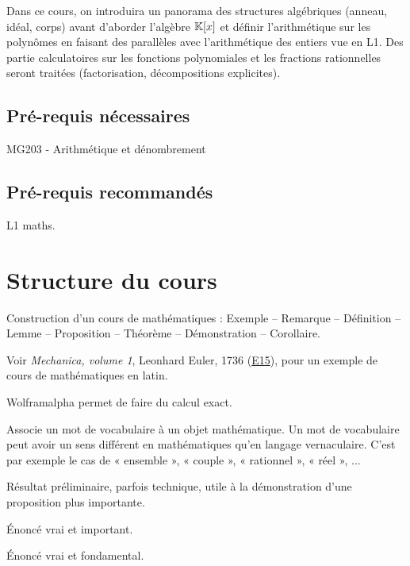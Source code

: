 Dans ce cours, on introduira un panorama des structures algébriques (anneau, idéal, corps) avant d'aborder l'algèbre $\mathbb{K}[x]$ et définir l'arithmétique
sur les polynômes en faisant des parallèles avec l'arithmétique des entiers vue en L1.
Des partie calculatoires sur les fonctions polynomiales et les fractions rationnelles seront traitées (factorisation, décompositions explicites).

\subsection*{Pré-requis nécessaires}

MG203 - Arithmétique et dénombrement

\subsection*{Pré-requis recommandés}

L1 maths.

\section*{Structure du cours}

Construction d'un cours de mathématiques : Exemple -- Remarque -- Définition -- Lemme -- Proposition -- Théorème -- Démonstration -- Corollaire.

Voir \emph{Mechanica, volume 1}, Leonhard Euler, 1736 (\href{https://scholarlycommons.pacific.edu/euler-works/15/}{E15}), pour un exemple de cours de mathématiques en latin.

Wolframalpha permet de faire du calcul exact.

\begin{definition*}
Associe un mot de vocabulaire à un objet mathématique.
Un mot de vocabulaire peut avoir un sens différent en mathématiques qu'en langage vernaculaire.
C'est par exemple le cas de « ensemble », « couple », « rationnel », « réel », ...
\end{definition*}

\begin{lemme*}
	Résultat préliminaire, parfois technique, utile à la démonstration d'une proposition plus importante.
\end{lemme*}

\begin{proposition*}
	Énoncé vrai et important.
\end{proposition*}

\begin{theorem*}
	Énoncé vrai et fondamental.
\end{theorem*}

